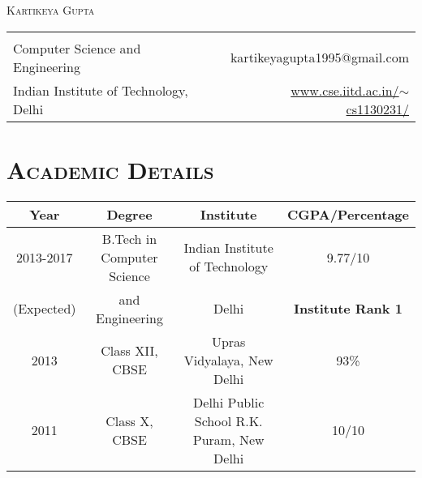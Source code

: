 \documentclass{article}
\newcommand{\tmpsection}[1]{}
\let\tmpsection=\section
\renewcommand{\section}[1]{\tmpsection*{\textsc{#1}}}
\begin{document}
\begin{center}
 {\large \textsc{Kartikeya Gupta} }\\ 
\begin{tabular}{ l p{4cm} r }
    & &   \\
  Computer Science and Engineering & & kartikeyagupta1995@gmail.com \\
  Indian Institute of Technology, Delhi & & \href{http://www.cse.iitd.ac.in/~cs1130231/}{www.cse.iitd.ac.in/$\sim$cs1130231/} \\
\end{tabular}
\end{center}


\section{Academic Details}
\begin{center}
\begin{tabular}{ |c | c | c | c |}
\hline
Year & Degree & Institute & CGPA/Percentage \\ 
\hline
2013-2017 & B.Tech in Computer Science & Indian Institute of Technology & 9.77/10 \\ 
(Expected) & and Engineering & Delhi & \textbf{Institute Rank 1} \\ \hline


2013 & Class XII, CBSE & Upras Vidyalaya, New Delhi & 93\% \\ 

\hline
2011 & Class X, CBSE & Delhi Public School R.K. Puram,  New Delhi & 10/10 \\  \hline
\end{tabular}
\end{center}
\end{document}
